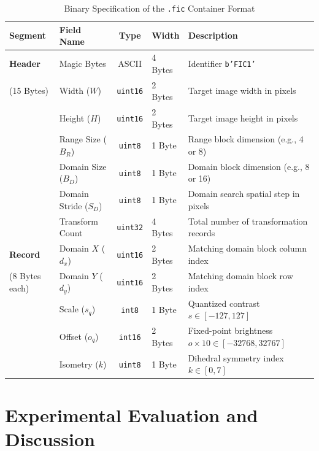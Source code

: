 \documentclass[11pt,a4paper]{article}
\begin{document}
\begin{table}[htbp]
\centering
\caption{Binary Specification of the \texttt{.fic} Container Format}
\label{tab:binary_spec}
\vspace{0.5em}
\small
\begin{tabularx}{\textwidth}{llclX}
\toprule
\textbf{Segment} & \textbf{Field Name} & \textbf{Type} & \textbf{Width} & \textbf{Description} \\
\midrule
\textbf{Header} & Magic Bytes & ASCII & 4 Bytes & Identifier \texttt{b'FIC1'} \\
(15 Bytes) & Width ($W$) & \texttt{uint16} & 2 Bytes & Target image width in pixels \\
& Height ($H$) & \texttt{uint16} & 2 Bytes & Target image height in pixels \\
& Range Size ($B_R$) & \texttt{uint8} & 1 Byte & Range block dimension (e.g., 4 or 8) \\
& Domain Size ($B_D$) & \texttt{uint8} & 1 Byte & Domain block dimension (e.g., 8 or 16) \\
& Domain Stride ($S_D$) & \texttt{uint8} & 1 Byte & Domain search spatial step in pixels \\
& Transform Count & \texttt{uint32} & 4 Bytes & Total number of transformation records \\
\midrule
\textbf{Record} & Domain $X$ ($d_x$) & \texttt{uint16} & 2 Bytes & Matching domain block column index \\
(8 Bytes each) & Domain $Y$ ($d_y$) & \texttt{uint16} & 2 Bytes & Matching domain block row index \\
& Scale ($s_q$) & \texttt{int8} & 1 Byte & Quantized contrast $s \in [-127, 127]$ \\
& Offset ($o_q$) & \texttt{int16} & 2 Bytes & Fixed-point brightness $o \times 10 \in [-32768, 32767]$ \\
& Isometry ($k$) & \texttt{uint8} & 1 Byte & Dihedral symmetry index $k \in [0, 7]$ \\
\bottomrule
\end{tabularx}
\end{table}

\section{Experimental Evaluation and Discussion}
\label{sec:eval}
\end{document}
